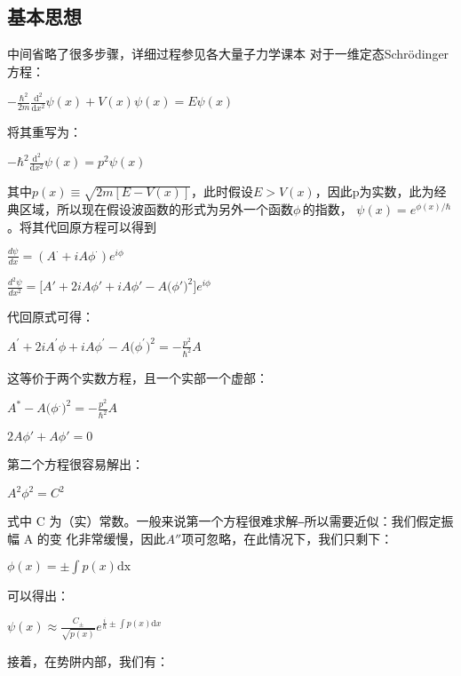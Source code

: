 \documentclass[12pt, a4paper, oneside]{ctexart}
\begin{document}
\begin{spacing}{2.0}
\subsection{基本思想}
中间省略了很多步骤，详细过程参见各大量子力学课本\cite{griffiths_schroeter_2018}
对于一维定态Schrödinger方程：
\begin{center}
    $\displaystyle - \frac{\hbar^2}{2m} \frac{\mathrm{d}^2}{\mathrm{d}x^2} \psi(x) + V(x) \psi(x) = E \psi(x)\,\!$
\end{center}
将其重写为：
\begin{center}
    $\displaystyle -\hbar^2\frac{\mathrm{d}^2}{\mathrm{d}x^2} \psi(x) =p^2\psi(x)\,\!$
\end{center}
其中$p(x)\equiv \sqrt{2m[E-V(x)]}$，此时假设$E>V(x)$，因此p为实数，此为经典区域，所以现在假设波函数的形式为另外一个函数$\phi\,\!$的指数，
$\displaystyle \psi(x) = e^{\phi(x)/\hbar} \,\!$。将其代回原方程可以得到
\begin{center}
    $\displaystyle\frac{d\psi}{dx}=\left(A^\cdot+i A\phi^\cdot\right)e^{i\phi}$
\end{center}
\begin{center}
    $\displaystyle\frac{d^2\psi}{dx^2}=\bigg[A'+2i A\phi'+i A\phi'-A\Big(\phi'\Big)^2\bigg]e^{i\phi}$
\end{center}
代回原式可得：
\begin{center}
    $\displaystyle A^{'}+2i A^{'}\phi+i A\phi^{'}-A\Big(\phi^{'}\Big)^{2}=-\frac{p^{2}}{\hbar^{2}}A$
\end{center}
这等价于两个实数方程，且一个实部一个虚部：
\begin{center}
    $\displaystyle A^*-A\Big(\phi^.\Big)^2=-\frac{p^2}{\hbar^2}A$
\end{center}
\begin{center}
    $2A\phi'+A\phi'=0$
\end{center}
第二个方程很容易解出：
\begin{center}
    $A^2\phi^2=C^2$
\end{center}
式中 C 为（实）常数。一般来说第一个方程很难求解⎯所以需要近似：我们假定振幅 A 的变
化非常缓慢，因此$A''$项可忽略，在此情况下，我们只剩下：
\begin{center}
    $\displaystyle\phi(x) = \pm \int p(x) \mathrm{dx}$
\end{center}
可以得出：
\begin{center}
    $\displaystyle\psi(x) \approx  \frac{C_{\pm}} {\sqrt{p(x)}}  e^{\frac{i}{\hbar}\pm\int p(x) \mathrm{d}x}$
\end{center}
接着，在势阱内部，我们有：

\end{spacing}
\end{document}
